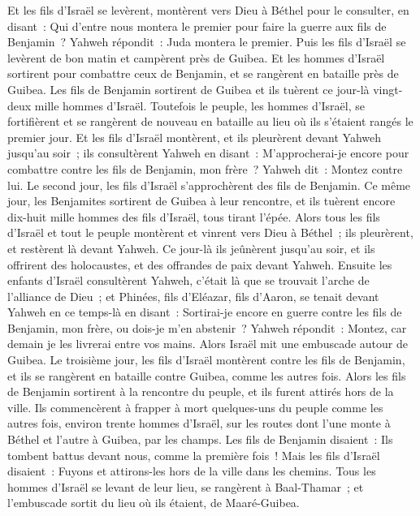 \begin{multicols}{2}
Et les fils d'Israël se levèrent, montèrent vers Dieu à Béthel pour le consulter, en disant~: Qui d'entre nous montera le premier pour faire la guerre aux fils de Benjamin~? Yahweh répondit~: Juda montera le premier.
Puis les fils d'Israël se levèrent de bon matin et campèrent près de Guibea.
Et les hommes d'Israël sortirent pour combattre ceux de Benjamin, et se rangèrent en bataille près de Guibea.
Les fils de Benjamin sortirent de Guibea et ils tuèrent ce jour-là vingt-deux mille hommes d'Israël.
Toutefois le peuple, les hommes d'Israël, se fortifièrent et se rangèrent de nouveau en bataille au lieu où ils s'étaient rangés le premier jour.
Et les fils d'Israël montèrent, et ils pleurèrent devant Yahweh jusqu'au soir~; ils consultèrent Yahweh en disant~: M'approcherai-je encore pour combattre contre les fils de Benjamin, mon frère~? Yahweh dit~: Montez contre lui.
Le second jour, les fils d'Israël s'approchèrent des fils de Benjamin.
Ce même jour, les Benjamites sortirent de Guibea à leur rencontre, et ils tuèrent encore dix-huit mille hommes des fils d'Israël, tous tirant l'épée.
Alors tous les fils d'Israël et tout le peuple montèrent et vinrent vers Dieu à Béthel~; ils pleurèrent, et restèrent là devant Yahweh. Ce jour-là ils jeûnèrent jusqu'au soir, et ils offrirent des holocaustes, et des offrandes de paix devant Yahweh.
Ensuite les enfants d'Israël consultèrent Yahweh, c'était là que se trouvait l'arche de l'alliance de Dieu~;
et Phinées, fils d'Eléazar, fils d'Aaron, se tenait devant Yahweh en ce temps-là en disant~: Sortirai-je encore en guerre contre les fils de Benjamin, mon frère, ou dois-je m'en abstenir~? Yahweh répondit~: Montez, car demain je les livrerai entre vos mains.
Alors Israël mit une embuscade autour de Guibea.
Le troisième jour, les fils d'Israël montèrent contre les fils de Benjamin, et ils se rangèrent en bataille contre Guibea, comme les autres fois.
Alors les fils de Benjamin sortirent à la rencontre du peuple, et ils furent attirés hors de la ville. Ils commencèrent à frapper à mort quelques-uns du peuple comme les autres fois, environ trente hommes d'Israël, sur les routes dont l'une monte à Béthel et l'autre à Guibea, par les champs.
Les fils de Benjamin disaient~: Ils tombent battus devant nous, comme la première fois~! Mais les fils d'Israël disaient~: Fuyons et attirons-les hors de la ville dans les chemins.
Tous les hommes d'Israël se levant de leur lieu, se rangèrent à Baal-Thamar~; et l'embuscade sortit du lieu où ils étaient, de Maaré-Guibea.

\end{multicols}
